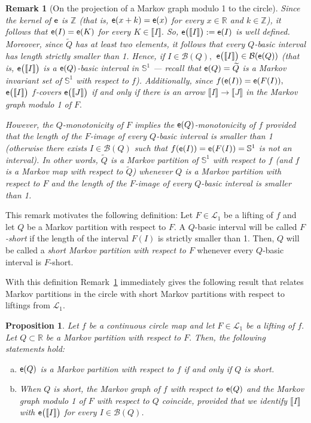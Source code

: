 \documentclass[a4paper, 11pt]{amsart}
\numberwithin{equation}{section}
\newtheorem{proposition}[theorem]{Proposition}
\theoremstyle{customnumberedtheorem}
\theoremstyle{definitionwithbfnote}
\newtheorem{remark}[theorem]{Remark}
\newcommand{\Z}{\ensuremath{\mathbb{Z}}}
\newcommand{\R}{\ensuremath{\mathbb{R}}}
\newcommand{\SI}{\ensuremath{\mathbb{S}^1}}
\DeclareMathOperator{\eexp}{\textsf{\upshape e}}
\newcommand{\dol}[1][1]{\ensuremath{\mathcal{L}_{#1}}}
\newcommand{\BIclass}[1]{\ensuremath{\llbracket #1\rrbracket}}
\newcommand{\emap}[1]{\ensuremath{\eexp(#1)}}
\newcommand{\bigemap}[1]{\ensuremath{\eexp\bigl(#1\bigr)}}
\def\calB{\mathcal{B}}
\newcommand{\SBI}[1][Q]{\ensuremath{\calB(#1)}}
\begin{document}
\begin{remark}[On the projection of a Markov graph modulo 1 to the circle]\label{projectiontoSI}
Since the kernel of $\eexp$ is $\Z$
(that is, $\emap{x + k} = \emap{x}$ for every $x \in \R$ and $k \in \Z$),
it follows that $\emap{I} = \emap{K}$  for every $K \in \BIclass{I}.$
So, $\bigemap{\BIclass{I}} := \emap{I}$ is well defined.
Moreover, since $\widetilde{Q}$ has at least two elements, it follows
that every $Q$-basic interval has length strictly smaller than 1.
Hence, if $I \in \SBI,$ $\bigemap{\BIclass{I}} \in \SBI[\emap{Q}]$
(that is, $\bigemap{\BIclass{I}}$ is a $\emap{Q}$-basic interval in $\SI$
--- recall that $\emap{Q} = \widetilde{Q}$ is a Markov invariant set
of $\SI$ with respect to $f$).
Additionally, since $f(\emap{I}) = \emap{F(I)},$
$\bigemap{\BIclass{I}}$ $f$-covers $\bigemap{\BIclass{J}}$
if and only if there is an arrow $\BIclass{I} \longrightarrow \BIclass{J}$
in the Markov graph modulo 1 of $F.$

However, the $Q$-monotonicity of $F$ implies the
$\emap{Q}$-monotonicity of $f$
\emph{provided that the length of the $F$-image of every
$Q$-basic interval is smaller than 1\/}
(otherwise there exists $I \in \SBI$ such that
$f(\emap{I}) = \emap{F(I)} = \SI$ is not an interval).
In other words,
$\widetilde{Q}$ is a Markov partition of $\SI$ with respect to $f$
(and $f$ is a Markov map with respect to $\widetilde{Q}$)
whenever $Q$ is a Markov partition with respect to $F$ and
the length of the $F$-image of every $Q$-basic interval is smaller than 1.
\end{remark}

This remark motivates the following definition:
Let $F\in \dol$ be a lifting of $f$ and let $Q$ be a Markov partition with respect to $F.$
A $Q$-basic interval will be called \emph{$F$-short\/} if the length of the
interval $F(I)$ is strictly smaller than 1.
Then, $Q$ will be called a \emph{short Markov partition with respect to $F$}
whenever every $Q$-basic interval is $F$-short.

With this definition Remark~\ref{projectiontoSI} immediately gives
the following result that relates Markov partitions in the circle with
short Markov partitions with respect to liftings from $\dol$.

\begin{proposition}\label{Markov partitionprojectiontoSI}
Let $f$ be a continuous circle map and let $F\in \dol$ be a lifting of $f.$
Let $Q \subset \R$ be a Markov partition with respect to $F.$
Then, the following statements hold:
\begin{enumerate}[(a)]
\item $\emap{Q}$ is a Markov partition with respect to $f$ if and only if $Q$ is short.
\item When $Q$ is short,
the Markov graph of $f$ with respect to $\emap{Q}$ and
the Markov graph modulo 1 of $F$ with respect to $Q$ coincide,
provided that we identify $\BIclass{I}$ with $\bigemap{\BIclass{I}}$
for every $I \in \SBI$.
\end{enumerate}
\end{proposition}
\end{document}
